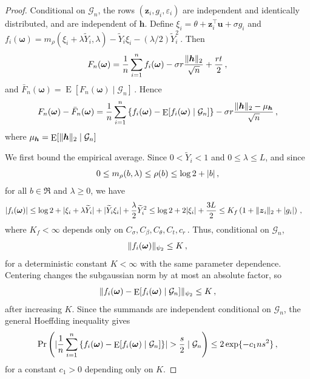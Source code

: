 \documentclass{article}
\makeatletter
\DeclareMathOperator{\expect}{E}
\theoremstyle{definition}
\newcommand{\vnorm}[1]{%
	\ensuremath{%
		\if@display
		\left\| #1 \right\|
		\else
		\| #1 \|
		\fi
	}%
}
\newcommand{\abs}[1]{%
	\ensuremath{%
		\if@display
		\left| #1 \right|
		\else
		\lvert #1 \rvert
		\fi
	}%
}
\newcommand*{\bb}{\boldsymbol}
\def\bu{\bb{u}}
\def\bh{\bb{h}}
\def\Ytil{\widetilde{Y}}
\def\bz{\bb{z}}
\makeatother
\begin{document}
\begin{bibunit}
\begin{proof}
		Conditional on $\mathcal G_n$, the rows $(\bz_i,g_i,\varepsilon_i)$ are independent and identically distributed, and are independent of $\bh$. Define $\xi_i=\theta+\bz_i^\top\bu+\sigma g_i$
		and $f_i(\bb\omega) = m_\rho(\xi_i+\lambda \Ytil_i,\lambda) - \Ytil_i\xi_i - (\lambda/2)\Ytil_i^2\,.$
	Then
	$$
		F_n(\bb\omega)
		=
		\frac1n\sum_{i=1}^n f_i(\bb\omega)
		-
		\sigma r\frac{\vnorm{\bh}_2}{\sqrt n}
		+
		\frac{rt}{2}\,,
	$$
	and $\bar F_n(\bb\omega) = \expect[F_n(\bb\omega)\mid\mathcal G_n]\,.$
	Hence
	$$
		F_n(\bb\omega)-\bar F_n(\bb\omega)
		=
		\frac1n\sum_{i=1}^n
		\left\{
			f_i(\bb\omega)
			-
			\expect[f_i(\bb\omega)\mid\mathcal G_n]
		\right\}
		-
		\sigma r
		\frac{
			\vnorm{\bh}_2-\mu_{\bh}
		}{\sqrt n}\,,
	$$
	where $\mu_{\bh} = \expect[\vnorm{\bh}_2 \mid \mathcal G_n]$

	We first bound the empirical average. Since $0<\Ytil_i<1$ and $0\leq\lambda\leq L$, and since
	$$
		0\leq m_\rho(b,\lambda)\leq \rho(b)\leq \log 2+\abs b\,,
	$$
	for all $b\in\Re$ and $\lambda\geq0$, we have
	$$
		\begin{aligned}
		\abs{f_i(\bb\omega)}
		&\leq
		\log 2+\abs{\xi_i+\lambda \Ytil_i}
		+
		\abs{\Ytil_i\xi_i}
		+
		\frac{\lambda}{2}\Ytil_i^2\leq
		\log 2
		+
		2\abs{\xi_i}
		+
		\frac{3L}{2}\leq
		K_f
		\left(
			1+\vnorm{\bz_i}_2+\abs{g_i}
		\right)\,,
		\end{aligned}
	$$
	where $K_f<\infty$ depends only on $C_\sigma,C_\beta,C_\theta,C_t,c_r\,.$
		Thus, conditional on $\mathcal G_n$,
	$$
		\vnorm{f_i(\bb\omega)}_{\psi_2}\leq K\,,
	$$
	for a deterministic constant $K<\infty$ with the same parameter dependence. Centering changes the subgaussian norm by at most an absolute factor, so
	$$
		\vnorm{
			f_i(\bb\omega)
			-
			\expect[f_i(\bb\omega)\mid\mathcal G_n]
		}_{\psi_2}
		\leq K\,,
	$$
	after increasing $K$. Since the summands are independent conditional on $\mathcal G_n$, the general Hoeffding inequality \citep[Theorem~2.6.3]{vershynin:2018} gives
	$$
		\Pr\left(
			\abs{
				\frac1n\sum_{i=1}^n
				\left\{
					f_i(\bb\omega)
					-
					\expect[f_i(\bb\omega)\mid\mathcal G_n]
				\right\}
			}
			>\frac{s}{2}
			\mid
			\mathcal G_n
		\right)
		\leq
		2\exp\{-c_1ns^2\}\,,
	$$
	for a constant $c_1>0$ depending only on $K$.


\end{proof}
\end{bibunit}
\end{document}
